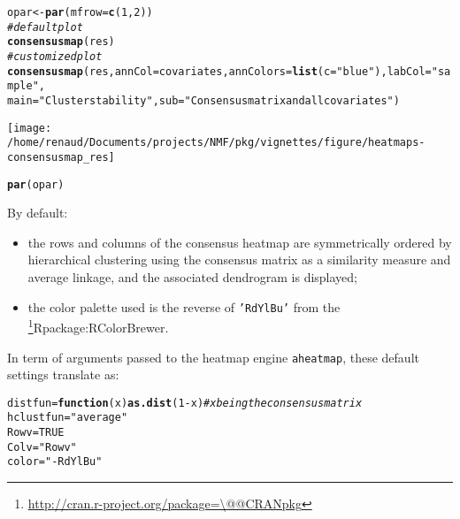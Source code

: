 \documentclass[a4paper]{article}\usepackage[]{graphicx}\usepackage[]{color}
\makeatletter
\def\maxwidth{ %
  \ifdim\Gin@nat@width>\linewidth
    \linewidth
  \else
    \Gin@nat@width
  \fi
}
\newcommand{\hlnum}[1]{\textcolor[rgb]{0.686,0.059,0.569}{#1}}%
\newcommand{\hlstr}[1]{\textcolor[rgb]{0.192,0.494,0.8}{#1}}%
\newcommand{\hlcom}[1]{\textcolor[rgb]{0.678,0.584,0.686}{\textit{#1}}}%
\newcommand{\hlopt}[1]{\textcolor[rgb]{0,0,0}{#1}}%
\newcommand{\hlstd}[1]{\textcolor[rgb]{0.345,0.345,0.345}{#1}}%
\newcommand{\hlkwa}[1]{\textcolor[rgb]{0.161,0.373,0.58}{\textbf{#1}}}%
\newcommand{\hlkwb}[1]{\textcolor[rgb]{0.69,0.353,0.396}{#1}}%
\newcommand{\hlkwc}[1]{\textcolor[rgb]{0.333,0.667,0.333}{#1}}%
\newcommand{\hlkwd}[1]{\textcolor[rgb]{0.737,0.353,0.396}{\textbf{#1}}}%
\newenvironment{kframe}{%
 \def\at@end@of@kframe{}%
 \ifinner\ifhmode%
  \def\at@end@of@kframe{\end{minipage}}%
  \begin{minipage}{\columnwidth}%
 \fi\fi%
 \def\FrameCommand##1{\hskip\@totalleftmargin \hskip-\fboxsep
 \colorbox{shadecolor}{##1}\hskip-\fboxsep
     \hskip-\linewidth \hskip-\@totalleftmargin \hskip\columnwidth}%
 \MakeFramed {\advance\hsize-\width
   \@totalleftmargin\z@ \linewidth\hsize
   \@setminipage}}%
 {\par\unskip\endMakeFramed%
 \at@end@of@kframe}
\newenvironment{knitrout}{}{} %
\let\code=\texttt
\newcommand{\pkgname}[1]{\textit{#1}\xspace}
\newcommand{\CRANurl}[1]{\url{http://cran.r-project.org/package=#1}}
\def\CRANpkg{\@ifstar\@CRANpkg\@@CRANpkg}
\def\@CRANpkg#1{\href{http://cran.r-project.org/package=#1}{\pkgname{#1}}\footnote{\CRANurl{#1}}}
\def\@@CRANpkg#1{\href{http://cran.r-project.org/package=#1}{\pkgname{#1}} package\footnote{\CRANurl{#1}}}
\def\citeCRANpkg{\@ifstar\@citeCRANpkg\@@citeCRANpkg}
\def\@citeCRANpkg#1{\CRANpkg{#1}\cite*{Rpackage:#1}}
\def\@@citeCRANpkg#1{\CRANpkg{#1}~\cite{Rpackage:#1}}
\renewcommand{\cite}[1]{\parencite{#1}}
\makeatother
\begin{document}
\begin{knitrout}
\color{fgcolor}\begin{kframe}
\begin{alltt}
\hlstd{opar} \hlkwb{<-} \hlkwd{par}\hlstd{(}\hlkwc{mfrow} \hlstd{=} \hlkwd{c}\hlstd{(}\hlnum{1}\hlstd{,} \hlnum{2}\hlstd{))}
\hlcom{# default plot}
\hlkwd{consensusmap}\hlstd{(res)}
\hlcom{# customized plot}
\hlkwd{consensusmap}\hlstd{(res,} \hlkwc{annCol} \hlstd{= covariates,} \hlkwc{annColors} \hlstd{=} \hlkwd{list}\hlstd{(}\hlkwc{c} \hlstd{=} \hlstr{"blue"}\hlstd{),} \hlkwc{labCol} \hlstd{=} \hlstr{"sample "}\hlstd{,}
    \hlkwc{main} \hlstd{=} \hlstr{"Cluster stability"}\hlstd{,} \hlkwc{sub} \hlstd{=} \hlstr{"Consensus matrix and all covariates"}\hlstd{)}
\end{alltt}
\end{kframe}
\texttt{[image: /home/renaud/Documents/projects/NMF/pkg/vignettes/figure/heatmaps-consensusmap\_res]} 
\begin{kframe}\begin{alltt}
\hlkwd{par}\hlstd{(opar)}
\end{alltt}
\end{kframe}
\end{knitrout}


By default:
\begin{itemize}
\item the rows and columns of the consensus heatmap are symmetrically 
ordered by hierarchical clustering using the consensus matrix as a similarity 
measure and average linkage, and the associated dendrogram is displayed;
\item the color palette used is the reverse of \code{'RdYlBu'} from the \citeCRANpkg{RColorBrewer}.
\end{itemize}

In term of arguments passed to the heatmap engine \code{aheatmap}, these default 
settings translate as:

\begin{knitrout}
\color{fgcolor}\begin{kframe}
\begin{alltt}
\hlstd{distfun} \hlkwb{=} \hlkwa{function}\hlstd{(}\hlkwc{x}\hlstd{)} \hlkwd{as.dist}\hlstd{(}\hlnum{1} \hlopt{-} \hlstd{x)}  \hlcom{# x being the consensus matrix}
\hlstd{hclustfun} \hlkwb{=} \hlstr{"average"}
\hlstd{Rowv} \hlkwb{=} \hlnum{TRUE}
\hlstd{Colv} \hlkwb{=} \hlstr{"Rowv"}
\hlstd{color} \hlkwb{=} \hlstr{"-RdYlBu"}
\end{alltt}
\end{kframe}
\end{knitrout}
\end{document}
